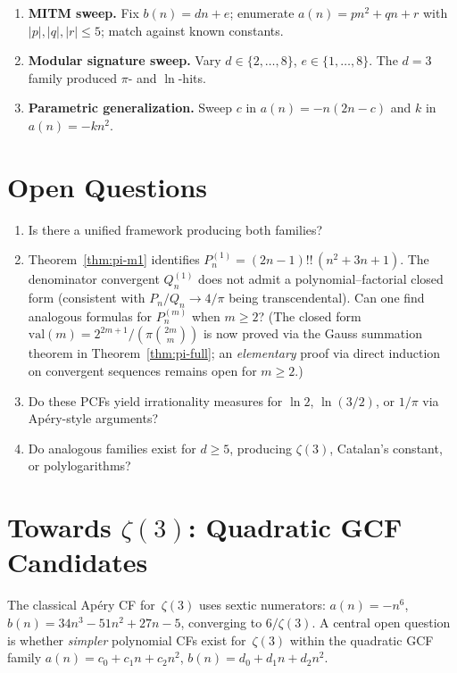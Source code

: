 \documentclass[11pt,a4paper]{article}
\theoremstyle{plain}
\theoremstyle{remark}
\begin{document}
\begin{enumerate}
\item \textbf{MITM sweep.}
  Fix $b(n)=dn{+}e$; enumerate $a(n)=pn^2{+}qn{+}r$
  with $|p|,|q|,|r|\le 5$; match against known constants.
\item \textbf{Modular signature sweep.}
  Vary $d\in\{2,\ldots,8\}$, $e\in\{1,\ldots,8\}$.
  The $d{=}3$ family produced $\pi$- and $\ln$-hits.
\item \textbf{Parametric generalization.}
  Sweep $c$ in $a(n)=-n(2n{-}c)$ and $k$ in $a(n)=-kn^2$.
\end{enumerate}

\section{Open Questions}

\begin{enumerate}
\item Is there a unified framework producing both families?
\item Theorem~\ref{thm:pi-m1} identifies $P_n^{(1)} = (2n{-}1)!!\,(n^2{+}3n{+}1)$.
  The denominator convergent $Q_n^{(1)}$ does not admit a polynomial--factorial
  closed form (consistent with $P_n/Q_n \to 4/\pi$ being transcendental).
  Can one find analogous formulas for $P_n^{(m)}$ when $m \ge 2$?
  (The closed form $\mathrm{val}(m) = 2^{2m+1}/(\pi\binom{2m}{m})$
  is now proved via the Gauss summation theorem in Theorem~\ref{thm:pi-full};
  an \emph{elementary} proof via direct induction on convergent sequences
  remains open for $m \ge 2$.)
\item Do these PCFs yield irrationality measures for $\ln 2$,
  $\ln(3/2)$, or $1/\pi$ via Ap\'ery-style arguments?
\item Do analogous families exist for $d \ge 5$,
  producing $\zeta(3)$, Catalan's constant, or polylogarithms?
\end{enumerate}

\section{Towards \texorpdfstring{$\zeta(3)$}{zeta(3)}: Quadratic GCF Candidates}\label{sec:zeta3}

The classical Ap\'ery CF for~$\zeta(3)$ uses sextic numerators:
$a(n)=-n^6$, $b(n)=34n^3-51n^2+27n-5$, converging to $6/\zeta(3)$.
A central open question is whether \emph{simpler} polynomial CFs
exist for~$\zeta(3)$ within the quadratic GCF family
$a(n) = c_0+c_1 n+c_2 n^2$, $b(n) = d_0+d_1 n+d_2 n^2$.
\end{document}
